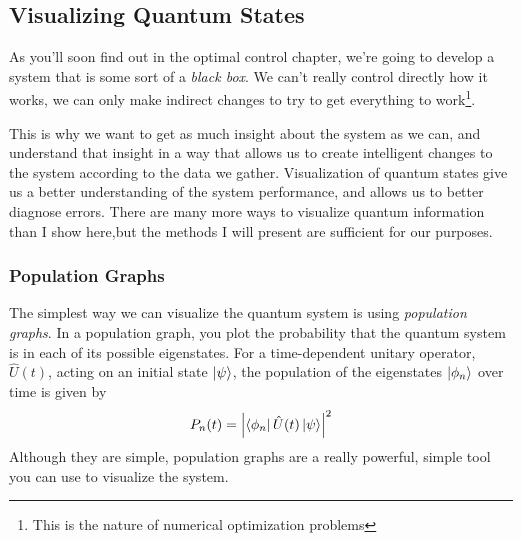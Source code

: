 
\subsection{Visualizing Quantum States}
As you'll soon find out in the optimal control chapter, we're going to develop a system that is some sort of a \textit{black box}. We can't really control directly how it works, we can only make indirect changes to try to get everything to work\footnote{This is the nature of numerical optimization problems}.

This is why we want to get as much insight about the system as we can, and understand that insight in a way that allows us to create intelligent changes to the system according to the data we gather. Visualization of quantum states give us a better understanding of the system performance, and allows us to better diagnose errors. There are many more ways to visualize quantum information than I show here,but the methods I will present are sufficient for our purposes.

\subsubsection{Population Graphs}
The simplest way we can visualize the quantum system is using \textit{population graphs}. In a population graph, you plot the probability that the quantum system is in each of its possible eigenstates. For a time-dependent unitary operator, $\hat{U} (t)$, acting on an initial state $\ket{\psi}$, the population of the eigenstates $\ket{\phi_n}$ over time is given by
\[
    P_n (t) = \abs{\bra{\phi_n}\hat{U} (t)\ket{\psi}}^2
\]
Although they are simple, population graphs are a really powerful, simple tool you can use to visualize the system.

